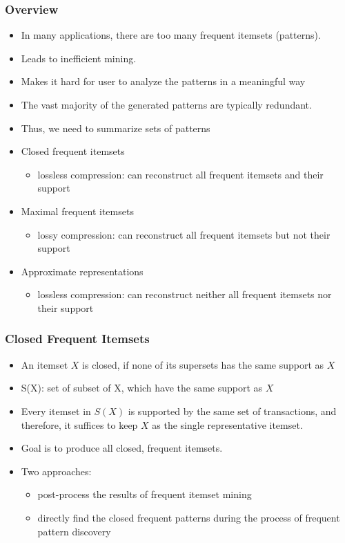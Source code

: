 \documentclass{article}
\begin{document}
\subsubsection{Overview}
\begin{itemize} 
  \item In many applications, there are too many frequent itemsets (patterns).
  \item Leads to inefficient mining.
  \item Makes it hard for user to analyze the patterns in a meaningful way
  \item The vast majority of the generated patterns are typically redundant.
  \item Thus, we need to summarize sets of patterns \\

  \item Closed frequent itemsets
  \begin{itemize} 
    \item lossless compression: can reconstruct all frequent itemsets and their support
  \end{itemize}

  \item Maximal frequent itemsets
  \begin{itemize} 
    \item lossy compression: can reconstruct all frequent itemsets but not their support
  \end{itemize}

  \item Approximate representations
  \begin{itemize} 
    \item lossless compression: can reconstruct neither all frequent itemsets nor their support
  \end{itemize}
\end{itemize}

\subsubsection{Closed Frequent Itemsets}
\begin{itemize} 
  \item An itemset $X$ is closed, if none of its supersets has the same support as $X$
  \item S(X): set of subset of X, which have the same support as $X$
  \item Every itemset in $S(X)$ is supported by the same set of transactions, and therefore, it suffices to keep $X$ as the single representative itemset. 
  \item Goal is to produce all closed, frequent itemsets.
  \item Two approaches:
  \begin{itemize} 
    \item post-process the results of frequent itemset mining
    \item directly find the closed frequent patterns during the process of frequent pattern discovery
  \end{itemize}
\end{itemize}
\end{document}
